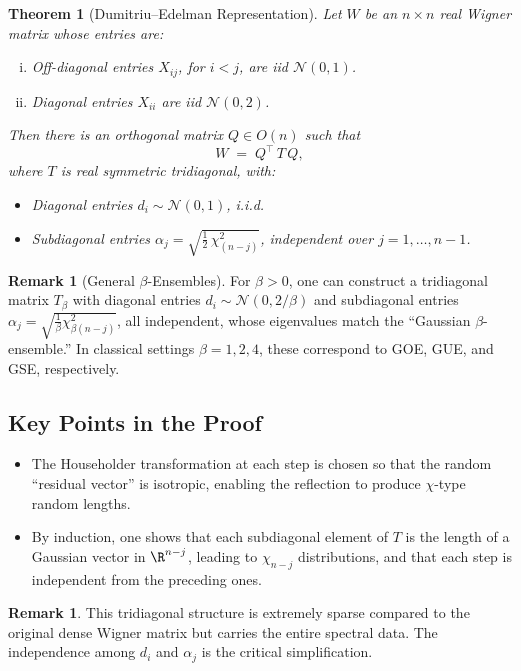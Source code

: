 \documentclass[letterpaper,11pt,oneside,reqno]{article}
\numberwithin{equation}{section}
\newtheorem{theorem}[proposition]{Theorem}
\theoremstyle{definition}
\newtheorem{remark}[proposition]{Remark}
\begin{document}
\begin{theorem}[Dumitriu--Edelman Representation]
\label{thm:DE-representation}
Let $W$ be an $n \times n$ real Wigner matrix whose entries are:
\begin{enumerate}[(i)]
\item Off-diagonal entries $X_{ij}$, for $i<j$, are iid $\mathcal{N}(0,1)$.
\item Diagonal entries $X_{ii}$ are iid $\mathcal{N}(0,2)$.
\end{enumerate}
Then there is an orthogonal matrix $Q \in O(n)$ such that
\[
  W \;=\; Q^\top \, T\, Q,
\]
where $T$ is real symmetric tridiagonal, with:
\begin{itemize}
\item Diagonal entries $d_i \sim \mathcal{N}(0,1)$, i.i.d.
\item Subdiagonal entries $\displaystyle \alpha_j = \sqrt{\frac12 \,\chi^2_{(n-j)}}$, independent over $j=1,\ldots,n-1$.
\end{itemize}
\end{theorem}

\begin{remark}[General $\beta$-Ensembles]
For $\beta>0$, one can construct a tridiagonal matrix $T_\beta$ with diagonal entries $d_i \sim \mathcal{N}(0,2/\beta)$ and subdiagonal entries $\alpha_j = \sqrt{\frac{1}{\beta}\chi^2_{\beta(n-j)}}$, all independent, whose eigenvalues match the “Gaussian $\beta$-ensemble.” In classical settings $\beta=1,2,4$, these correspond to GOE, GUE, and GSE, respectively.
\end{remark}

\subsection{Key Points in the Proof}

\begin{itemize}
\item The Householder transformation at each step is chosen so that the random “residual vector” is isotropic, enabling the reflection to produce $\chi$-type random lengths.
\item By induction, one shows that each subdiagonal element of $T$ is the length of a Gaussian vector in $\R^{n-j}$, leading to $\chi_{n-j}$ distributions, and that each step is independent from the preceding ones.
\end{itemize}

\begin{remark}
This tridiagonal structure is extremely sparse compared to the original dense Wigner matrix but carries the entire spectral data. The independence among $d_i$ and $\alpha_j$ is the critical simplification.
\end{remark}
\end{document}
